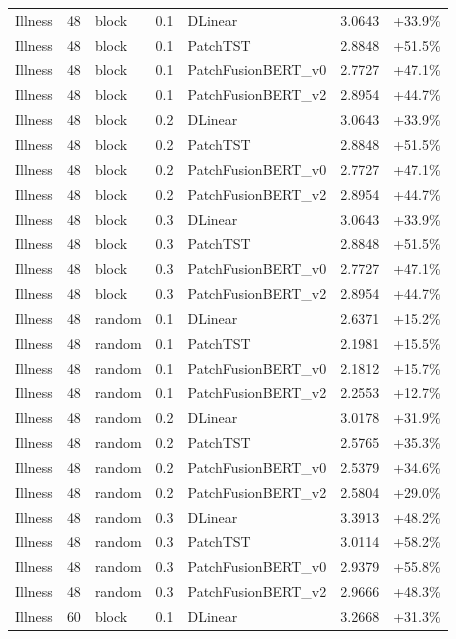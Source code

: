 \begin{tabular}{lllrlll}
Illness & 48 & block & 0.1 & DLinear & 3.0643 & +33.9\% \\
Illness & 48 & block & 0.1 & PatchTST & 2.8848 & +51.5\% \\
Illness & 48 & block & 0.1 & PatchFusionBERT_v0 & 2.7727 & +47.1\% \\
Illness & 48 & block & 0.1 & PatchFusionBERT_v2 & 2.8954 & +44.7\% \\
Illness & 48 & block & 0.2 & DLinear & 3.0643 & +33.9\% \\
Illness & 48 & block & 0.2 & PatchTST & 2.8848 & +51.5\% \\
Illness & 48 & block & 0.2 & PatchFusionBERT_v0 & 2.7727 & +47.1\% \\
Illness & 48 & block & 0.2 & PatchFusionBERT_v2 & 2.8954 & +44.7\% \\
Illness & 48 & block & 0.3 & DLinear & 3.0643 & +33.9\% \\
Illness & 48 & block & 0.3 & PatchTST & 2.8848 & +51.5\% \\
Illness & 48 & block & 0.3 & PatchFusionBERT_v0 & 2.7727 & +47.1\% \\
Illness & 48 & block & 0.3 & PatchFusionBERT_v2 & 2.8954 & +44.7\% \\
Illness & 48 & random & 0.1 & DLinear & 2.6371 & +15.2\% \\
Illness & 48 & random & 0.1 & PatchTST & 2.1981 & +15.5\% \\
Illness & 48 & random & 0.1 & PatchFusionBERT_v0 & 2.1812 & +15.7\% \\
Illness & 48 & random & 0.1 & PatchFusionBERT_v2 & 2.2553 & +12.7\% \\
Illness & 48 & random & 0.2 & DLinear & 3.0178 & +31.9\% \\
Illness & 48 & random & 0.2 & PatchTST & 2.5765 & +35.3\% \\
Illness & 48 & random & 0.2 & PatchFusionBERT_v0 & 2.5379 & +34.6\% \\
Illness & 48 & random & 0.2 & PatchFusionBERT_v2 & 2.5804 & +29.0\% \\
Illness & 48 & random & 0.3 & DLinear & 3.3913 & +48.2\% \\
Illness & 48 & random & 0.3 & PatchTST & 3.0114 & +58.2\% \\
Illness & 48 & random & 0.3 & PatchFusionBERT_v0 & 2.9379 & +55.8\% \\
Illness & 48 & random & 0.3 & PatchFusionBERT_v2 & 2.9666 & +48.3\% \\
Illness & 60 & block & 0.1 & DLinear & 3.2668 & +31.3\% \\

\end{tabular}
